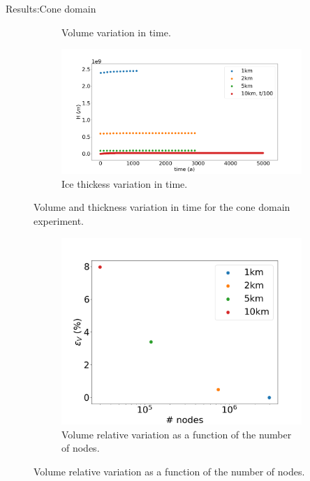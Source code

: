 \documentclass[11pt]{beamer}
\begin{document}
\begin{frame}[allowframebreaks]{Results:Cone domain}
\begin{figure}
\begin{subfigure}{.5\textwidth}
				\caption{Volume variation in time.}
				\label{VOLUME_CONE_VS_TIME}
			\end{subfigure}%
			\begin{subfigure}{.5\textwidth}
				\centering
				\includegraphics[width=1.1\linewidth]{../fig/H_CONE_full_all_res_vs_time.png}
				\caption{Ice thickess variation in time.}
				\label{H_CONE_VS_TIME}
			\end{subfigure}%
			\caption{Volume and thickness variation in time for the cone domain experiment.}
			\label{Volume_CONE_VS_TIME_VS_NODES}
		\end{figure}
		\begin{figure}
			\centering
			\begin{subfigure}{.45\textwidth}
				\centering
				\includegraphics[width=1.1\linewidth]{../fig/Volume_CONE_full_all_res_vs_num_nodes.png}
				\caption{Volume relative variation as a function of the number of nodes.}
				\label{VOLUME_CONE_VS_NODES}

\end{subfigure}
\end{figure}
\end{frame}
\end{document}
